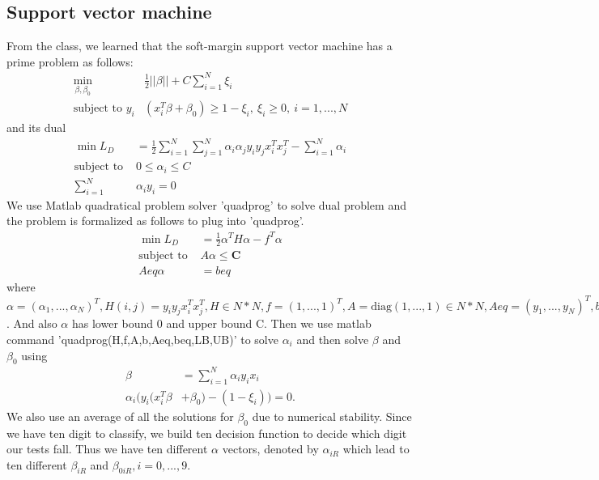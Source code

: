 \documentclass[11pt]{article}
\begin{document}
\subsection{Support vector machine}
From the class, we learned that the soft-margin support vector machine has a prime problem as follows:
\begin{equation}
\begin{aligned}
\min_{\beta,\beta_0}&\frac{1}{2}||\beta||+C\sum_{i=1}^{N}\xi_i\\
\textrm{subject~to~}y_i&(x_i^T\beta+\beta_0)\ge1-\xi_i,~\xi_i\ge0,~i=1,...,N
\end{aligned}
\end{equation}
and its dual
\begin{equation}
\begin{aligned}
\min L_D &= \frac{1}{2}\sum_{i=1}^N\sum_{j=1}^N\alpha_i\alpha_j y_iy_jx_i^Tx_j^T-\sum_{i=1}^N\alpha_i\\
\textrm{subject~to~} &0 \le\alpha_i\leq C\\
\sum_{i=1}^N&\alpha_iy_i=0
\end{aligned}
\end{equation}
We use Matlab quadratical problem solver 'quadprog' to solve dual problem and the problem is formalized as follows to plug into 'quadprog'.
\begin{equation}
\begin{aligned}
\min L_D &= \frac{1}{2}\alpha^TH\alpha-f^T\alpha\\
\textrm{subject~to~} &A\alpha \le \textbf{C}\\
Aeq\alpha &= beq
\end{aligned}
\end{equation}
where $\alpha = (\alpha_1,...,\alpha_N)^T, H(i,j) = y_iy_jx_i^Tx_j^T,H\in N*N , f = (1,...,1)^T, A = \textrm{diag}(1,...,1)\in N*N, Aeq = (y_1,...,y_N)^T, beq = 0\in N*1$. And also $\alpha$ has lower bound 0 and upper bound C. Then we use  matlab command 'quadprog(H,f,A,b,Aeq,beq,LB,UB)' to solve $\alpha_i$ and then solve $\beta$ and $\beta_0$ using
\begin{equation}
\begin{aligned}
\beta &= \sum_{i=1}^N\alpha_iy_ix_i\\
\alpha_i(y_i(x_i^T\beta &+ \beta_0)-(1-\xi_i))=0.
\end{aligned}
\end{equation}
We also use an average of all the solutions for $\beta_0$ due to numerical stability. Since we have ten digit to classify, we build ten decision function to decide which digit our tests fall. Thus we have ten different $\alpha$ vectors, denoted by  $\alpha_{iR}$ which lead to ten different $\beta_{iR}$ and $\beta_{0iR}, i = 0,...,9$.
\end{document}

